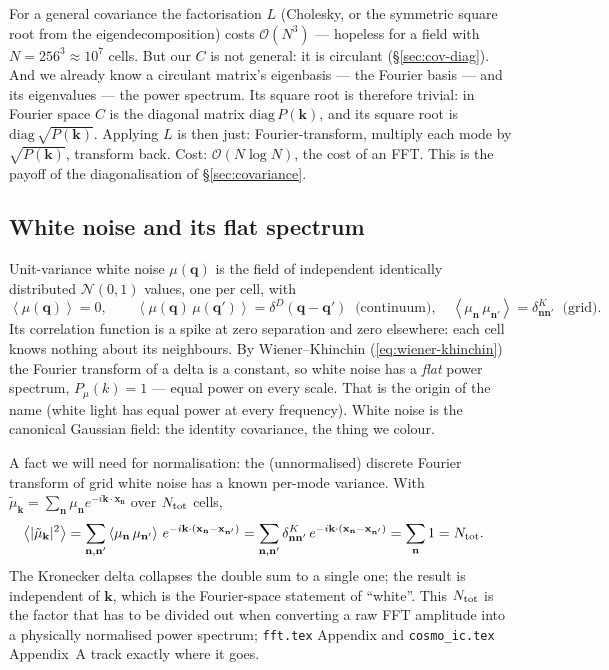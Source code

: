 \documentclass[12pt]{article}
\newcommand{\bk}{\mathbf{k}}
\newcommand{\bx}{\mathbf{x}}
\newcommand{\bn}{\mathbf{n}}
\newcommand{\bq}{\mathbf{q}}
\newcommand{\avg}[1]{\left\langle #1 \right\rangle}
\newcommand{\code}[1]{\texttt{#1}}
\begin{document}
For a general covariance the factorisation $L$ (Cholesky, or the
symmetric square root from the eigendecomposition) costs $\mathcal
O(N^3)$ --- hopeless for a field with $N = 256^3 \approx 10^7$ cells.
But our $C$ is not general: it is circulant (\S\ref{sec:cov-diag}).  And
we already know a circulant matrix's eigenbasis --- the Fourier basis ---
and its eigenvalues --- the power spectrum.  Its square root is therefore
trivial: in Fourier space $C$ is the diagonal matrix
$\mathrm{diag}\,P(\bk)$, and its square root is
$\mathrm{diag}\,\sqrt{P(\bk)}$.  Applying $L$ is then just:
Fourier-transform, multiply each mode by $\sqrt{P(\bk)}$, transform back.
Cost: $\mathcal O(N \log N)$, the cost of an FFT.  This is the payoff of
the diagonalisation of \S\ref{sec:covariance}.

\subsection{White noise and its flat spectrum}
\label{sec:whitenoise}

Unit-variance white noise $\mu(\bq)$ is the field of independent
identically distributed $\mathcal N(0,1)$ values, one per cell, with
\begin{equation}
  \avg{\mu(\bq)} = 0,
  \qquad
  \avg{\mu(\bq)\,\mu(\bq')} = \delta^D(\bq - \bq')
  \;\;\text{(continuum)},
  \quad
  \avg{\mu_\bn\,\mu_{\bn'}} = \delta^K_{\bn\bn'}
  \;\;\text{(grid)}.
  \label{eq:whitenoise}
\end{equation}
Its correlation function is a spike at zero separation and zero
elsewhere: each cell knows nothing about its neighbours.  By
Wiener--Khinchin (\ref{eq:wiener-khinchin}) the Fourier transform of a
delta is a constant, so white noise has a \emph{flat} power spectrum,
$P_\mu(k) = 1$ --- equal power on every scale.  That is the origin of the
name (white light has equal power at every frequency).  White noise is
the canonical Gaussian field: the identity covariance, the thing we
colour.

A fact we will need for normalisation: the (unnormalised) discrete
Fourier transform of grid white noise has a known per-mode variance.
With $\tilde\mu_\bk = \sum_\bn \mu_\bn e^{-i\bk\cdot\bx_\bn}$ over
$N_{\rm tot}$ cells,
\begin{align}
  \avg{|\tilde\mu_\bk|^2}
  &= \sum_{\bn,\bn'} \avg{\mu_\bn\,\mu_{\bn'}}\,
     e^{-i\bk\cdot(\bx_\bn - \bx_{\bn'})}
   = \sum_{\bn,\bn'} \delta^K_{\bn\bn'}\,
     e^{-i\bk\cdot(\bx_\bn - \bx_{\bn'})}
   = \sum_\bn 1 = N_{\rm tot}.
  \label{eq:whitenoise-permode}
\end{align}
The Kronecker delta collapses the double sum to a single one; the result
is independent of $\bk$, which is the Fourier-space statement of
``white''.  This $N_{\rm tot}$ is the factor that has to be divided out
when converting a raw FFT amplitude into a physically normalised power
spectrum; \code{fft.tex} Appendix and \code{cosmo\_ic.tex} Appendix~A
track exactly where it goes.
\end{document}
